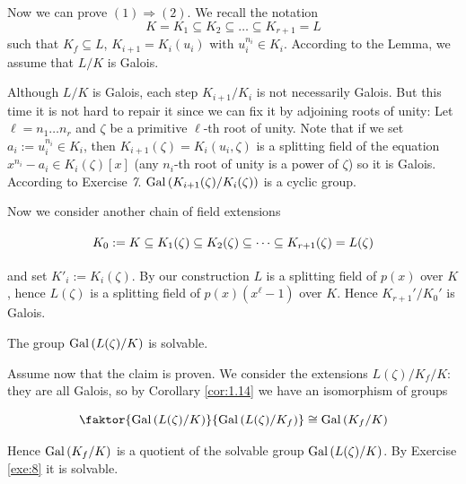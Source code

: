 \documentclass[twoside = false,	%
		headsepline,		%
		parskip = true,
		]{scrbook}						%
\begin{document}
    Now we can prove $(1) \Rightarrow (2)$. We recall the notation
    \begin{equation*}
        K = K_1 \subseteq K_2 \subseteq \dots \subseteq K_{r+1} = L
    \end{equation*}
    such that $K_f \subseteq L$, $K_{i+1} = K_i(u_i)$ with $u_i^{n_i} \in K_i$. According to the Lemma, we assume that $L/K$ is Galois.
    
    Although $L/K$ is Galois, each step $K_{i+1}/K_i$ is not necessarily Galois. But this time it is not hard to repair it since we can fix it by adjoining roots of unity:
    Let $\ell = n_1 \dots n_r$ and $\zeta$ be a primitive $\ell$-th root of unity. Note that if we set $a_i := u_i^{n_i} \in K_i$, then $K_{i+1}(\zeta) = K_i(u_i,\zeta)$ is a splitting field of the equation $x^{n_i} - a_i \in K_i(\zeta)[x]$ (any $n_i$-th root of unity is a power of $\zeta$) so it is Galois.
    According to Exercise \textit{7}. $\mathrm{Gal}\left( K_{i+1}(\zeta)/K_i(\zeta)\right)$ is a cyclic group.
    
    Now we consider another chain of field extensions
    
    \begin{equation*}
        \xymatrix{
            K_0 := K \subseteq K_1(\zeta) \subseteq K_2(\zeta) \subseteq \dots \subseteq K_{r+1}(\zeta) = L(\zeta)
        }
    \end{equation*}
    
    and set $K'_i:= K_i(\zeta)$. By our construction $L$ is a splitting field of $p(x)$ over $K$, hence $L(\zeta)$ is a splitting field of $p(x)(x^\ell - 1)$ over $K$. Hence $K_{r+1}'/K_0'$ is Galois.
    
    \begin{claim*}{}{}
        The group $\mathrm{Gal}\left( L(\zeta)/K\right)$ is solvable.
    \end{claim*}
    
    Assume now that the claim is proven. We consider the extensions $L(\zeta)/K_f /K$: they are all Galois, so by Corollary \ref{cor:1.14} we have an isomorphism of groups
    
    \begin{equation*}
        \faktor{\Gal{L(\zeta)/K}}{\Gal{L(\zeta)/K_f}} \cong \Gal{K_f / K}
    \end{equation*}
    
    Hence $\mathrm{Gal}\left( K_f/K\right)$ is a quotient of the solvable group $\mathrm{Gal}\left( L(\zeta)/K\right)$. By Exercise \ref{exe:8} it is solvable.
    
\end{document}
